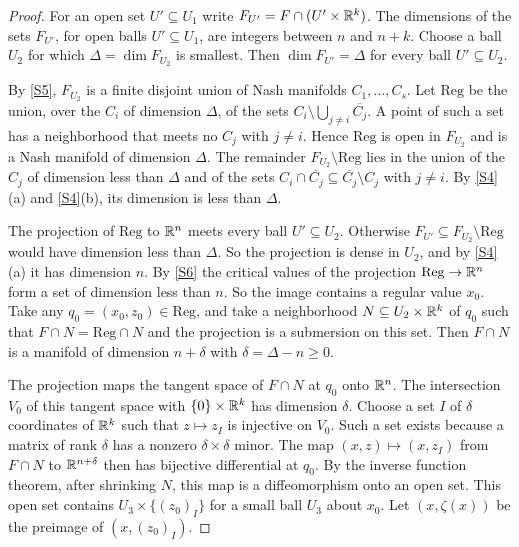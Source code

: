 \begin{proof}
For an open set $U'\subseteq U_1$ write $F_{U'}=F\cap(U'\times\mathbb{R}^k)$. The dimensions of the sets $F_{U'}$, for open balls $U'\subseteq U_1$, are integers between $n$ and $n+k$. Choose a ball $U_2$ for which $\Delta=\dim F_{U_2}$ is smallest. Then $\dim F_{U'}=\Delta$ for every ball $U'\subseteq U_2$.

By \ref{S5}, $F_{U_2}$ is a finite disjoint union of Nash manifolds $C_1,\dots,C_s$. Let $\mathrm{Reg}$ be the union, over the $C_i$ of dimension $\Delta$, of the sets $C_i\setminus\bigcup_{j\ne i}\overline{C_j}$. A point of such a set has a neighborhood that meets no $C_j$ with $j\ne i$. Hence $\mathrm{Reg}$ is open in $F_{U_2}$ and is a Nash manifold of dimension $\Delta$. The remainder $F_{U_2}\setminus\mathrm{Reg}$ lies in the union of the $C_j$ of dimension less than $\Delta$ and of the sets $C_i\cap\overline{C_j}\subseteq\overline{C_j}\setminus C_j$ with $j\ne i$. By \ref{S4}(a) and \ref{S4}(b), its dimension is less than $\Delta$.

The projection of $\mathrm{Reg}$ to $\mathbb{R}^n$ meets every ball $U'\subseteq U_2$. Otherwise $F_{U'}\subseteq F_{U_2}\setminus\mathrm{Reg}$ would have dimension less than $\Delta$. So the projection is dense in $U_2$, and by \ref{S4}(a) it has dimension $n$. By \ref{S6} the critical values of the projection $\mathrm{Reg}\to\mathbb{R}^n$ form a set of dimension less than $n$. So the image contains a regular value $x_0$. Take any $q_0=(x_0,z_0)\in\mathrm{Reg}$, and take a neighborhood $N\subseteq U_2\times\mathbb{R}^k$ of $q_0$ such that $F\cap N=\mathrm{Reg}\cap N$ and the projection is a submersion on this set. Then $F\cap N$ is a manifold of dimension $n+\delta$ with $\delta=\Delta-n\ge0$.

The projection maps the tangent space of $F\cap N$ at $q_0$ onto $\mathbb{R}^n$. The intersection $V_0$ of this tangent space with $\{0\}\times\mathbb{R}^k$ has dimension $\delta$. Choose a set $I$ of $\delta$ coordinates of $\mathbb{R}^k$ such that $z\mapsto z_I$ is injective on $V_0$. Such a set exists because a matrix of rank $\delta$ has a nonzero $\delta\times\delta$ minor. The map $(x,z)\mapsto(x,z_I)$ from $F\cap N$ to $\mathbb{R}^{n+\delta}$ then has bijective differential at $q_0$. By the inverse function theorem, after shrinking $N$, this map is a diffeomorphism onto an open set. This open set contains $U_3\times\{(z_0)_I\}$ for a small ball $U_3$ about $x_0$. Let $(x,\zeta(x))$ be the preimage of $(x,(z_0)_I)$.
\end{proof}

